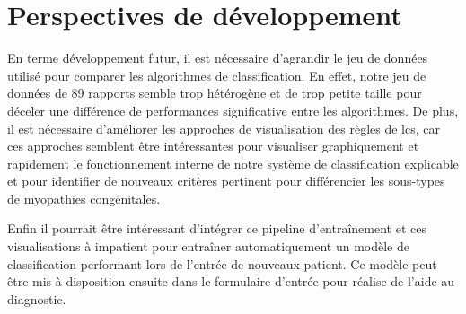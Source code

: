 \section{Perspectives de développement}
En terme développement futur, il est nécessaire d'agrandir le jeu de données utilisé pour comparer les algorithmes de classification. En effet, notre jeu de données de 89 rapports semble trop hétérogène et de trop petite taille pour déceler une différence de performances significative entre les algorithmes. De plus, il est nécessaire d'améliorer les approches de visualisation des règles de \gls{lcs}, car ces approches semblent être intéressantes pour visualiser graphiquement et rapidement le fonctionnement interne de notre système de classification explicable et pour identifier de nouveaux critères pertinent pour différencier les sous-types de myopathies congénitales.

Enfin il pourrait être intéressant d'intégrer ce pipeline d'entraînement et ces visualisations à \gls{impatient} pour entraîner automatiquement un modèle de classification performant lors de l'entrée de nouveaux patient. Ce modèle peut être mis à disposition ensuite dans le formulaire d'entrée pour réalise de l'aide au diagnostic.